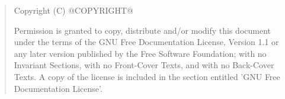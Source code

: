 \bigskip
\begin{quote}
   Copyright (C) @COPYRIGHT@

   Permission is granted to copy, distribute and/or modify this document
   under the terms of the GNU Free Documentation License, Version 1.1
   or any later version published by the Free Software Foundation;
   with no Invariant Sections, with no Front-Cover Texts, and with no
   Back-Cover Texts.
   A copy of the license is included in the section entitled 'GNU
   Free Documentation License'.
\end{quote}
\bigskip

